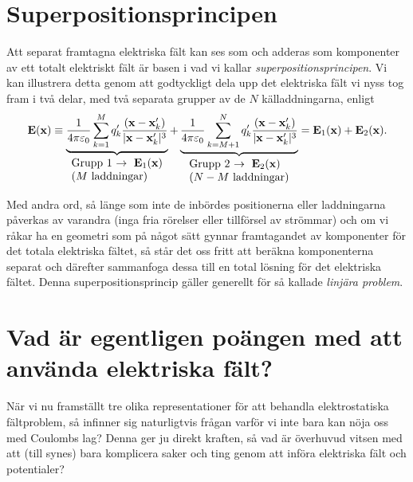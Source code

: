 \section{Superpositionsprincipen}
Att separat framtagna elektriska f{\"a}lt kan ses som och adderas som komponenter av ett totalt elektriskt f{\"a}lt {\"a}r basen i vad vi kallar {\it superpositionsprincipen}.
Vi kan illustrera detta genom att godtyckligt dela upp det elektriska f{\"a}lt vi nyss tog fram i tv{\aa} delar, med tv{\aa} separata grupper av de $N$ k{\"a}lladdningarna, enligt
$$
  {\bf E}({\bf x})\equiv
  \underbrace{{{1}\over{4\pi\varepsilon_0}}\sum^M_{k=1}
     q'_k {{({\bf x}-{\bf x}'_k)}\over{|{\bf x}-{\bf x}'_k|^3}}}_{\vbox{\hbox{Grupp 1 $\rightarrow\ {\bf E}_1({\bf x})$}\hbox{($M$ laddningar)}}}
  +\underbrace{{{1}\over{4\pi\varepsilon_0}}\sum^{N}_{k=M+1}
     q'_k {{({\bf x}-{\bf x}'_k)}\over{|{\bf x}-{\bf x}'_k|^3}}}_{\vbox{\hbox{Grupp 2 $\rightarrow\ {\bf E}_2({\bf x})$}\hbox{($N-M$ laddningar)}}}={\bf E}_1({\bf x})+{\bf E}_2({\bf x}).
$$
\bigskip\centerline{}
\medskip
\noindent
Med andra ord, s{\aa} l{\"a}nge som inte de inb{\"o}rdes positionerna eller laddningarna p{\aa}verkas av varandra (inga fria r{\"o}relser eller tillf{\"o}rsel av str{\"o}mmar) och om vi r{\aa}kar ha en geometri som p{\aa} n{\aa}got s{\"a}tt gynnar framtagandet av komponenter f{\"o}r det totala elektriska f{\"a}ltet, s{\aa} st{\aa}r det oss fritt att ber{\"a}kna komponenterna separat och d{\"a}refter sammanfoga dessa till en total l{\"o}sning f{\"o}r det elektriska f{\"a}ltet. Denna superpositionsprincip g{\"a}ller generellt f{\"o}r s{\aa} kallade {\it linj{\"a}ra problem}.

\section{Vad {\"a}r egentligen po{\"a}ngen med att anv{\"a}nda elektriska f{\"a}lt?}
N{\"a}r vi nu framst{\"a}llt tre olika representationer f{\"o}r att behandla elektrostatiska f{\"a}ltproblem, s{\aa} infinner sig naturligtvis fr{\aa}gan varf{\"o}r vi inte bara kan n{\"o}ja oss med Coulombs lag? Denna ger ju direkt kraften, s{\aa} vad {\"a}r {\"o}verhuvud vitsen med att (till synes) bara komplicera saker och ting genom att inf{\"o}ra elektriska f{\"a}lt och potentialer?
\vfill\eject

